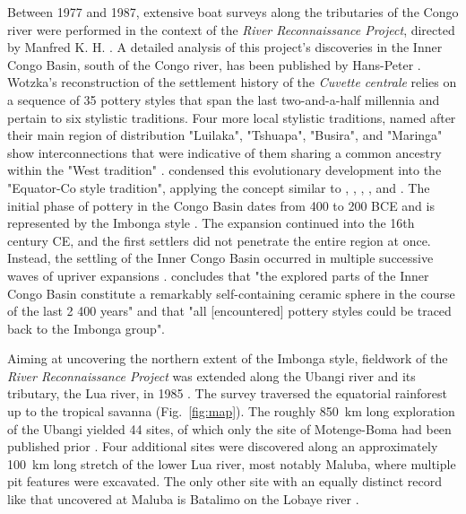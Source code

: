 \documentclass[smallextended,natbib]{svjour3}       %
\begin{document}
Between 1977 and 1987, extensive boat surveys along the tributaries of the Congo river were performed in the context of the \textit{River Reconnaissance Project}, directed by Manfred K. H. \citet{Eggert.1983,Eggert.1984,Eggert.1993,Eggert.1996}. A detailed analysis of this project’s discoveries in the Inner Congo Basin, south of the Congo river, has been published by Hans-Peter \citet{Wotzka.1993}. Wotzka’s reconstruction of the settlement history of the \textit{Cuvette centrale} relies on a sequence of 35 pottery styles that span the last two-and-a-half millennia and pertain to six stylistic traditions. Four more local stylistic traditions, named after their main region of distribution "Luilaka", "Tshuapa", "Busira", and "Maringa" show interconnections that were indicative of them sharing a common ancestry within the "West tradition" \citep[219--225 Fig.~4]{Wotzka.1995}. \citet{Wotzka.1995} condensed this evolutionary development into the "Equator-Co style tradition", applying the concept similar to \citet{Rouse.1957}, \citet{Huffman.1970}, \citet{Schmidt.1975}, \citet{Vogel.1978}, and \citet{Hall.1983}. The initial phase of pottery in the Congo Basin dates from 400 to 200 BCE and is represented by the Imbonga style \citep[59--68]{Wotzka.1995}. The expansion continued into the 16th century CE, and the first settlers did not penetrate the entire region at once. Instead, the settling of the Inner Congo Basin occurred in multiple successive waves of upriver expansions \citep[226--241]{Wotzka.1995}. \citet[290]{Wotzka.1995} concludes that "the explored parts of the Inner Congo Basin constitute a remarkably self-containing ceramic sphere in the course of the last 2 400 years" and that "all [encountered] pottery styles could be traced back to the Imbonga group".

Aiming at uncovering the northern extent of the Imbonga style, fieldwork of the \textit{River Reconnaissance Project} was extended along the Ubangi river and its tributary, the Lua river, in 1985 \citep{Eggert.1987a}. The survey traversed the equatorial rainforest up to the tropical savanna (Fig.~\ref{fig:map}). The roughly 850~km long exploration of the Ubangi yielded 44 sites, of which only the site of Motenge-Boma had been published prior \citep[75]{vanNoten.1978,vanNoten.1982a}. Four additional sites were discovered along an approximately 100~km long stretch of the lower Lua river, most notably Maluba, where multiple pit features were excavated. The only other site with an equally distinct record like that uncovered at Maluba is Batalimo on the Lobaye river \citep{DeBayleDesHermens.1969,DeBayleDesHermens.1971,deBayledesHermens.1975}.
\end{document}
